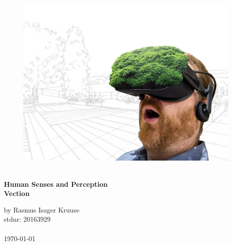\begin{titlepage}
			
\addtolength{\voffset}{2cm}

\begin{figure}[H]
\centering
\vspace{2cm}	%
\includegraphics[width=0.99\linewidth]{figure/Frontpage/gardenposterCropped.png}
\end{figure}

\mbox{}
\vfill
\renewcommand{\familydefault}{\sfdefault} \normalfont %
\HRule\\[0.1cm]
\textbf{{\small Human Senses and Perception\\ {\Huge Vection}}} \hspace{0.15cm}\\
\HRule\smallskip{}

\Large by \LARGE Rasmus Isager Kruuse\\
\Large stdnr: 20163929\\\\


\today
\renewcommand{\familydefault}{\rmdefault} \normalfont %
\end{titlepage}



